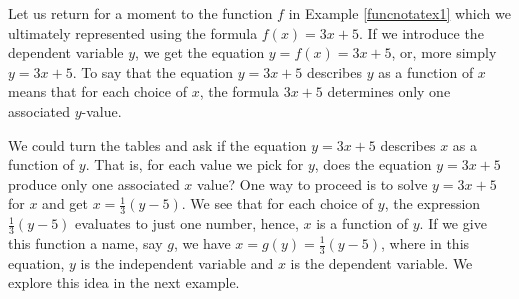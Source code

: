 \documentclass{ximera}
\begin{document}
\medskip

Let us return for a moment to the function $f$  in Example \ref{funcnotatex1} which we ultimately represented using the formula  $f(x) = 3x+5$.  If we introduce the dependent variable $y$, we get the equation  $y = f(x) = 3x + 5$, or, more simply $y = 3x + 5$.  To say that the equation  $y = 3x + 5$ describes $y$ as a function of $x$ means that for each choice of $x$, the formula $3x + 5$ determines only one associated $y$-value.  

\medskip

We could turn the tables and ask if the equation $y=3x+5$ describes $x$ as a function of $y$.  That is, for each value we pick for  $y$,  does the equation $y = 3x+5$ produce only one associated $x$ value?  One way to proceed is to solve $y = 3x+5$ for $x$ and get $x= \frac{1}{3} (y-5)$.  We see that for each choice of $y$, the expression $\frac{1}{3} (y-5)$ evaluates to just one number, hence, $x$ is a function of $y$.  If we give this function a name, say $g$, we have $x = g(y) = \frac{1}{3}(y-5)$, where in this equation, $y$ is the independent variable and $x$ is the dependent variable.  We explore this idea in the next example.

\pagebreak
\end{document}
